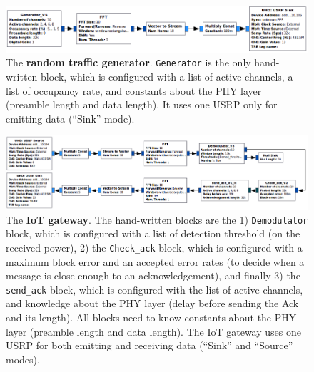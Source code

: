 \begin{figure}[!b]
	\centering
    \includegraphics[width=1.00\textwidth]{2-Chapters/4-Chapter/Images/USRP_TX_PU__v1__simple_grc.png}
    \caption{The \textbf{random traffic generator}. \texttt{Generator} is the only hand-written block, which is configured with a list of active channels, a list of occupancy rate, and constants about the PHY layer (preamble length and data length). It uses one USRP only for emitting data (``Sink'' mode).}
    \label{fig:4app:USRP_TX_PU__v1__simple_grc}
\end{figure}

\begin{figure}[!b]
	\centering
    \includegraphics[width=1.00\textwidth]{2-Chapters/4-Chapter/Images/USRP_RX_BTS__v1__simple_grc.png}
    \caption{The \textbf{IoT gateway}. The hand-written blocks are the 1) \texttt{Demodulator} block, which is configured with a list of detection threshold (on the received power), 2) the \texttt{Check\_ack} block, which is configured with a maximum block error and an accepted error rates (to decide when a message is close enough to an acknowledgement), and finally 3) the \texttt{send\_ack} block, which is configured with the list of active channels, and knowledge about the PHY layer (delay before sending the Ack and its length). All blocks need to know constants about the PHY layer (preamble length and data length). The IoT gateway uses one USRP for both emitting and receiving data (``Sink'' and ``Source'' modes).}
    \label{fig:4app:USRP_RX_BTS__v1__simple_grc}
\end{figure}

